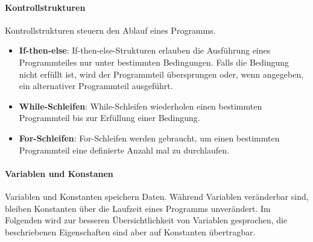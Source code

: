 \documentclass[11pt, a4paper]{article}
\begin{document}
\paragraph{Kontrollstrukturen}
Kontrollstrukturen steuern den Ablauf eines Programms.
\begin{itemize}
	\item \textbf{If-then-else}: If-then-else-Strukturen erlauben die Ausführung eines Programmteiles nur unter bestimmten Bedingungen. Falls die Bedingung nicht erfüllt ist, wird der Programmteil übersprungen oder, wenn angegeben, ein alternativer Programmteil ausgeführt.
	\item \textbf{While-Schleifen}: While-Schleifen wiederholen einen bestimmten Programmteil bis zur Erfüllung einer Bedingung.
	\item \textbf{For-Schleifen}: For-Schleifen werden gebraucht, um einen bestimmten Programmteil eine definierte Anzahl mal zu durchlaufen.
\end{itemize}

\paragraph{Variablen und Konstanen}
Variablen und Konstanten speichern Daten. Während Variablen veränderbar sind, bleiben Konstanten über die Laufzeit eines Programms unverändert. Im Folgenden wird zur besseren Übersichtlichkeit von Variablen gesprochen, die beschriebenen Eigenschaften sind aber auf Konstanten übertragbar.
\end{document}
